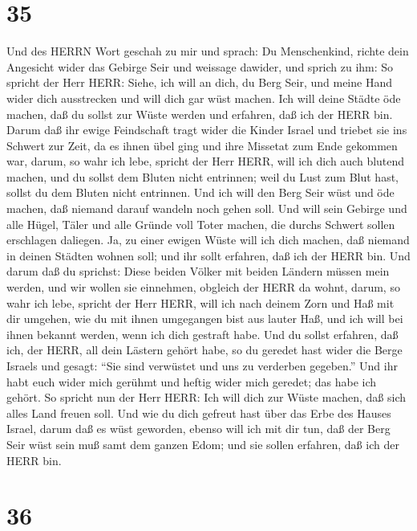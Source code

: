 \hypertarget{section-34}{%
\section{35}\label{section-34}}

 Und des HERRN Wort geschah zu mir und sprach: 
Du Menschenkind, richte dein Angesicht wider das Gebirge Seir und
weissage dawider,  und sprich zu ihm: So spricht der Herr
HERR: Siehe, ich will an dich, du Berg Seir, und meine Hand wider dich
ausstrecken und will dich gar wüst machen.  Ich will deine
Städte öde machen, daß du sollst zur Wüste werden und erfahren, daß ich
der HERR bin.  Darum daß ihr ewige Feindschaft tragt wider
die Kinder Israel und triebet sie ins Schwert zur Zeit, da es ihnen übel
ging und ihre Missetat zum Ende gekommen war,  darum, so
wahr ich lebe, spricht der Herr HERR, will ich dich auch blutend machen,
und du sollst dem Bluten nicht entrinnen; weil du Lust zum Blut hast,
sollst du dem Bluten nicht entrinnen.  Und ich will den Berg
Seir wüst und öde machen, daß niemand darauf wandeln noch gehen soll.
 Und will sein Gebirge und alle Hügel, Täler und alle Gründe
voll Toter machen, die durchs Schwert sollen erschlagen daliegen.
 Ja, zu einer ewigen Wüste will ich dich machen, daß niemand
in deinen Städten wohnen soll; und ihr sollt erfahren, daß ich der HERR
bin.  Und darum daß du sprichst: Diese beiden Völker mit
beiden Ländern müssen mein werden, und wir wollen sie einnehmen,
obgleich der HERR da wohnt,  darum, so wahr ich lebe,
spricht der Herr HERR, will ich nach deinem Zorn und Haß mit dir
umgehen, wie du mit ihnen umgegangen bist aus lauter Haß, und ich will
bei ihnen bekannt werden, wenn ich dich gestraft habe.  Und
du sollst erfahren, daß ich, der HERR, all dein Lästern gehört habe, so
du geredet hast wider die Berge Israels und gesagt: ``Sie sind verwüstet
und uns zu verderben gegeben.''  Und ihr habt euch wider
mich gerühmt und heftig wider mich geredet; das habe ich gehört.
 So spricht nun der Herr HERR: Ich will dich zur Wüste
machen, daß sich alles Land freuen soll.  Und wie du dich
gefreut hast über das Erbe des Hauses Israel, darum daß es wüst
geworden, ebenso will ich mit dir tun, daß der Berg Seir wüst sein muß
samt dem ganzen Edom; und sie sollen erfahren, daß ich der HERR bin.

\hypertarget{section-35}{%
\section{36}\label{section-35}}

